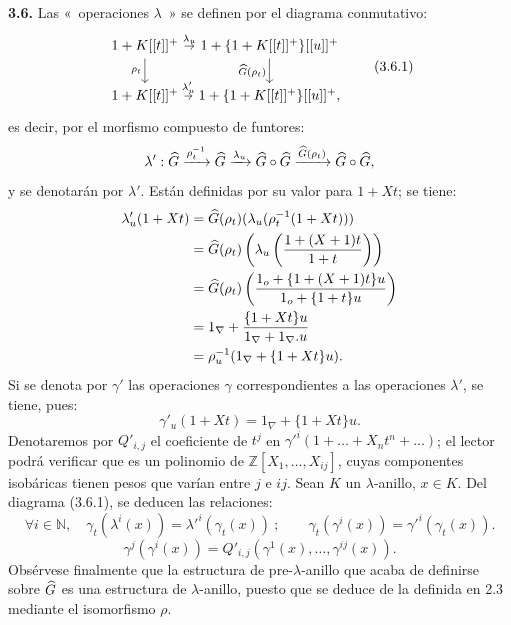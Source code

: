 \textbf{3.6.} Las «~operaciones \(\lambda\)~» se definen por el diagrama conmutativo:
\[
\begin{tikzcd}[column sep=tiny]
1+K[[t]]^+ \arrow[r,"\lambda_u"] \arrow[d,"\rho_t"'] &
1+\{1+K[[t]]^+\}[[u]]^+ \arrow[d,"\Ghat(\rho_t)"']\\
1+K[[t]]^+ \arrow[r,"\lambda'_u"] &
1+\{1+K[[t]]^+\}[[u]]^+ ,
\end{tikzcd}
\tag{3.6.1}
\]
es decir, por el morfismo compuesto de funtores:
\[
  \lambda' : \widehat G\xrightarrow{\rho_t^{-1}}\widehat G\xrightarrow{\lambda_u}\widehat G\circ\widehat G\xrightarrow{\widehat G(\rho_t)}\widehat G\circ\widehat G ,
\]
y se denotarán por \(\lambda'\). Están definidas por su valor para \(1+Xt\); se tiene:
\[
\begin{aligned}
\lambda'_u(1+Xt) &=\widehat G(\rho_t)(\lambda_u(\rho_t^{-1}(1+Xt)))\\
&=\widehat G(\rho_t)\left(\lambda_u\left(\frac{1+(X+1)t}{1+t}\right)\right)\\
&=\widehat G(\rho_t)\left(\frac{1_o+\{1+(X+1)t\}u}{1_o+\{1+t\}u}\right)\\
&=1_\nabla+\frac{\{1+Xt\}u}{1_\nabla+1_\nabla.u}\\
&=\rho_u^{-1}(1_\nabla+\{1+Xt\}u).
\end{aligned}
\]
Si se denota por \(\gamma'\) las operaciones \(\gamma\) correspondientes a las operaciones \(\lambda'\), se tiene, pues:
\begin{equation}\tag{3.6.2}
  \gamma'_u(1+Xt)=1_\nabla+\{1+Xt\}u .
\end{equation}
Denotaremos por \(Q'_{i,j}\) el coeficiente de \(t^j\) en \(\gamma'^i(1+\ldots+X_nt^n+\ldots)\); el lector podrá verificar que es un polinomio de \(\mathbb Z[X_1,\ldots,X_{ij}]\), cuyas componentes isobáricas tienen pesos que varían entre \(j\) e \(ij\). Sean \(K\) un \(\lambda\)-anillo, \(x\in K\). Del diagrama (3.6.1), se deducen las relaciones:
\begin{equation}\tag{3.6.3}
  \forall i\in\mathbb N,\quad\gamma_t(\lambda^i(x))=\lambda'^i(\gamma_t(x))~;
  \qquad
  \gamma_t(\gamma^i(x))=\gamma'^i(\gamma_t(x)).
\end{equation}
\begin{equation}\tag{3.6.4}
  \gamma^j(\gamma^i(x))
  =Q'_{i,j}(\gamma^1(x),\ldots,\gamma^{ij}(x)).
\end{equation}
Obsérvese finalmente que la estructura de pre-\(\lambda\)-anillo que acaba de definirse sobre \(\widehat G\) es una estructura de \(\lambda\)-anillo, puesto que se deduce de la definida en 2.3 mediante el isomorfismo \(\rho\).

